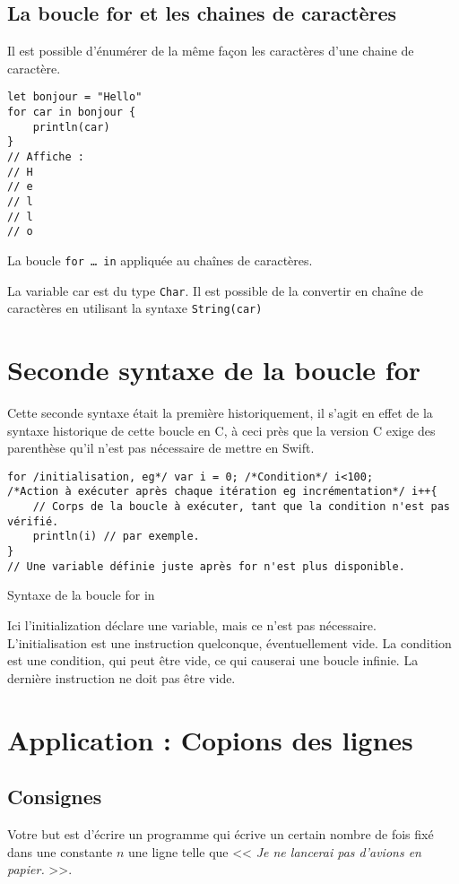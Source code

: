 \subsection{La boucle for et les chaines de caractères}
Il est possible d'énumérer de la même façon les caractères d'une chaine de caractère.
\begin{listing}[h]
\begin{verbatim}
let bonjour = "Hello"
for car in bonjour {
    println(car)
}
// Affiche :
// H
// e
// l
// l
// o
\end{verbatim}

\caption{La boucle \texttt{for … in} appliquée au chaînes de caractères.}
\end{listing}
La variable car est du type \texttt{Char}.
Il est possible de la convertir en chaîne de caractères en utilisant la syntaxe \texttt{String(car)}
\section{Seconde syntaxe de la boucle for}
Cette seconde syntaxe était la première historiquement,
il s'agit en effet de la syntaxe historique de cette boucle en C,
à ceci près que la version C exige des parenthèse
qu'il n'est pas nécessaire de mettre en Swift.

\begin{listing}[h]
\begin{verbatim}
for /initialisation, eg*/ var i = 0; /*Condition*/ i<100;
/*Action à exécuter après chaque itération eg incrémentation*/ i++{
    // Corps de la boucle à exécuter, tant que la condition n'est pas vérifié.
    println(i) // par exemple.
}
// Une variable définie juste après for n'est plus disponible.
\end{verbatim}
\caption{Syntaxe de la boucle for in}
\end{listing}
Ici l'initialization déclare une variable,
mais ce n'est pas nécessaire.
L'initialisation est une instruction quelconque, éventuellement vide.
La condition est une condition, qui peut être vide, ce qui causerai une boucle infinie.
La dernière instruction ne doit pas être vide.
\section{Application : Copions des lignes}
\subsection{Consignes}
Votre but est d'écrire un programme qui
écrive un certain nombre de fois fixé dans une constante $n$ une ligne telle que << \emph{Je ne lancerai pas d'avions en papier.} >>.
\pagebreak %
